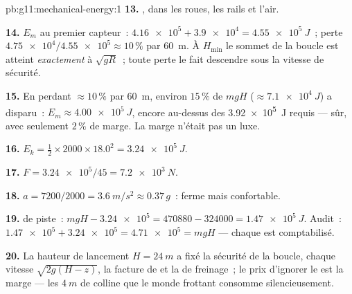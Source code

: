 \begin{solution}{pb:g11:mechanical-energy:1}
\textbf{13.} , dans les
roues, les rails et l'air.

\textbf{14.} $E_m$ au premier capteur~: $\num{4.16e5} + \num{3.9e4} =
\qty{4.55e5}{J}$~; perte $\num{4.75e4}/\num{4.55e5} \approx 10\,\%$ par
\qty{60}{m}. À $H_{\min}$ le sommet de la boucle est atteint
\emph{exactement} à $\sqrt{gR}$~; toute perte le fait descendre sous la
vitesse de sécurité.

\textbf{15.} En perdant $\approx 10\,\%$ par \qty{60}{m}, environ
$15\,\%$ de $mgH$ ($\approx \qty{7.1e4}{J}$) a disparu~:
$E_m \approx \qty{4.00e5}{J}$, encore au-dessus des \qty{3.92e5}{J}
requis --- sûr, avec seulement $2\,\%$ de marge. La marge n'était pas un
luxe.

\textbf{16.} $E_k = \tfrac12 \times 2000 \times 18.0^2 =
\qty{3.24e5}{J}$.

\textbf{17.} $F = \num{3.24e5}/45 = \qty{7.2e3}{N}$.

\textbf{18.} $a = 7200/2000 = \qty{3.6}{m/s^2} \approx 0.37\,g$~: ferme
mais confortable.

\textbf{19.}  de piste~:
$mgH - \num{3.24e5} = \num{470880} - \num{324000} = \qty{1.47e5}{J}$.
Audit~: $\num{1.47e5} + \num{3.24e5} = \num{4.71e5} = mgH$ --- chaque
 est comptabilisé.

\textbf{20.} La hauteur de lancement $H = \qty{24}{m}$ a fixé la
sécurité de la boucle, chaque vitesse $\sqrt{2g(H - z)}$, la facture de
 et la
 de freinage~; le prix d'ignorer le
 est la marge --- les
$\qty{4}{m}$ de colline que le monde frottant consomme silencieusement.
\end{solution}
